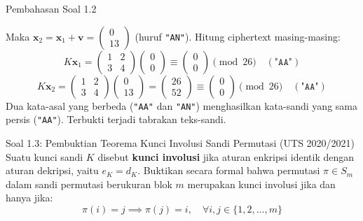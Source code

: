 \documentclass[11pt,a4paper]{article}
\begin{document}
\begin{solusibox}{Pembahasan Soal 1.2}
\begin{enumerate}[leftmargin=*]
    Maka $\mathbf{x}_2 = \mathbf{x}_1 + \mathbf{v} = \begin{pmatrix} 0 \\ 13 \end{pmatrix}$ (huruf \texttt{"AN"}).
    Hitung ciphertext masing-masing:
    \[
    K \mathbf{x}_1 = \begin{pmatrix} 1 & 2 \\ 3 & 4 \end{pmatrix} \begin{pmatrix} 0 \\ 0 \end{pmatrix} \equiv \begin{pmatrix} 0 \\ 0 \end{pmatrix} \pmod{26} \quad (\texttt{"AA"})
    \]
    \[
    K \mathbf{x}_2 = \begin{pmatrix} 1 & 2 \\ 3 & 4 \end{pmatrix} \begin{pmatrix} 0 \\ 13 \end{pmatrix} = \begin{pmatrix} 26 \\ 52 \end{pmatrix} \equiv \begin{pmatrix} 0 \\ 0 \end{pmatrix} \pmod{26} \quad (\texttt{"AA"})
    \]
    Dua kata-asal yang berbeda (\texttt{"AA"} dan \texttt{"AN"}) menghasilkan kata-sandi yang sama persis (\texttt{"AA"}). Terbukti terjadi tabrakan teks-sandi.
\end{enumerate}
\end{solusibox}

\vspace{0.4cm}

\begin{soalbox}{Soal 1.3: Pembuktian Teorema Kunci Involusi Sandi Permutasi (UTS 2020/2021)}
Suatu kunci sandi $K$ disebut \textbf{kunci involusi} jika aturan enkripsi identik dengan aturan dekripsi, yaitu $e_K = d_K$.
Buktikan secara formal bahwa permutasi $\pi \in S_m$ dalam sandi permutasi berukuran blok $m$ merupakan kunci involusi jika dan hanya jika:
\[
\pi(i) = j \implies \pi(j) = i, \quad \forall i, j \in \{1, 2, \dots, m\}
\]
\end{soalbox}
\end{document}
